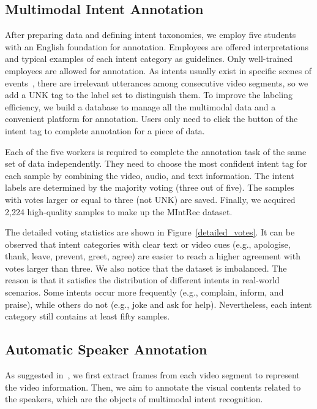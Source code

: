 \documentclass[sigconf,camera-ready]{acmart}
\begin{document}
\subsection{Multimodal Intent Annotation}
After preparing data and defining intent taxonomies, we employ five students with an English foundation for annotation. Employees are offered interpretations and typical examples of each intent category as guidelines. Only well-trained employees are allowed for annotation. As intents usually exist in specific scenes of events~\cite{schroder2014intention}, there are irrelevant utterances among consecutive video segments, so we add a UNK tag to the label set to distinguish them. To improve the labeling efficiency,  we build a database to manage all the multimodal data and a convenient  platform for annotation. Users only need to click the button of the intent tag to complete annotation for a piece of data.

Each of the five workers is required to complete the annotation task of the same set of data independently. They need to choose the most confident intent tag for each sample by combining the video, audio, and text information.  The intent labels are determined by the majority voting (three out of five).  The samples with votes larger or equal to three (not UNK)
are saved. Finally, we acquired 2,224 high-quality samples to make up the MIntRec dataset. 

The detailed voting statistics are shown in Figure~\ref{detailed_votes}. It can be observed that intent categories with clear text or video cues (e.g., apologise, thank, leave, prevent, greet, agree) are easier to reach a higher agreement with votes larger than three. We also notice that the dataset is imbalanced. The reason is that it satisfies the distribution of different intents in real-world scenarios. Some intents occur more frequently (e.g., complain, inform, and praise), while others do not (e.g., joke and ask for help). Nevertheless, each intent category still contains at least fifty samples. 

\subsection{Automatic Speaker Annotation}
As suggested in~\cite{MOSI, MOSEI, yu-etal-2020-ch}, we first extract frames from each video segment to represent the video information. Then, we aim to annotate the visual contents related to the speakers, which are the objects of multimodal intent recognition. 
\end{document}
